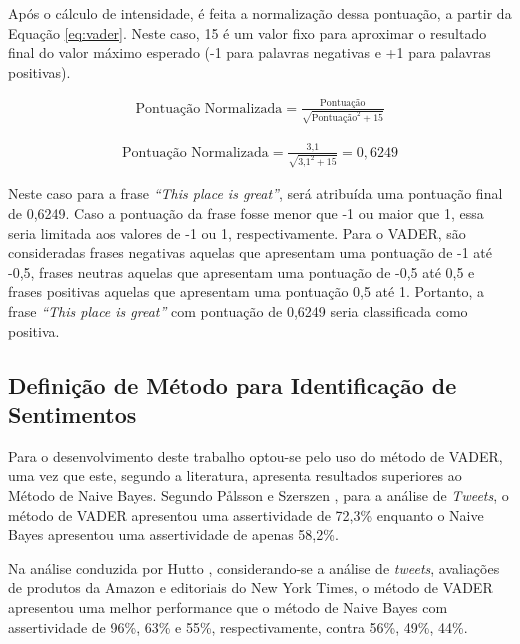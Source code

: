 Após o cálculo de intensidade, é feita a normalização dessa
pontuação, a partir da Equação \ref{eq:vader}. Neste caso, 15 é um valor
fixo para aproximar o resultado final do valor máximo esperado (-1 para
palavras negativas e +1 para palavras positivas).

\begin{equation}
\begin{gathered}
\text{Pontuação Normalizada}
=
\frac{\text{Pontuação}}{\sqrt{\text{Pontuação}^2 + 15}}
\label{eq:vader}
\end{gathered}
\end{equation}


\begin{equation}
\begin{gathered}
\text{Pontuação Normalizada}
=
\frac{\text{3,1}}{\sqrt{\text{3,1}^2 + 15}} = 0,6249
\label{eq:vaderscore}
\end{gathered}
\end{equation}

Neste caso para a frase \textit{``This place is great''}, será
atribuída uma pontuação final de 0,6249.  Caso a
pontuação da frase fosse menor que -1 ou maior que 1, essa seria limitada aos
valores de -1 ou 1, respectivamente. Para o \ac{VADER}, são consideradas frases negativas
aquelas que apresentam uma pontuação de -1 até -0,5, frases neutras aquelas que
apresentam uma pontuação de -0,5 até 0,5 e frases positivas aquelas que
apresentam uma pontuação 0,5 até 1.
Portanto, a frase \textit{``This place is great''} com pontuação de 0,6249 seria
classificada como positiva.

\subsection{Definição de Método para Identificação de Sentimentos}

Para o desenvolvimento deste trabalho optou-se pelo uso do método de \ac{VADER},
uma vez que este, segundo a literatura, apresenta resultados superiores ao
Método de Naive Bayes. Segundo Pålsson e Szerszen \cite{SentimentinSocialMedia},
para a análise de \textit{Tweets}, o método de \ac{VADER} apresentou uma
assertividade de 72,3\% enquanto o Naive Bayes apresentou uma assertividade de
apenas 58,2\%.

Na análise conduzida por Hutto \cite{conf/icwsm/HuttoG14},
considerando-se a análise de \textit{tweets}, avaliações de produtos da Amazon e
editoriais do New York Times, o método de \ac{VADER} apresentou uma melhor
performance que o método de Naive Bayes com assertividade de 96\%, 63\% e 55\%,
respectivamente, contra 56\%, 49\%, 44\%.

